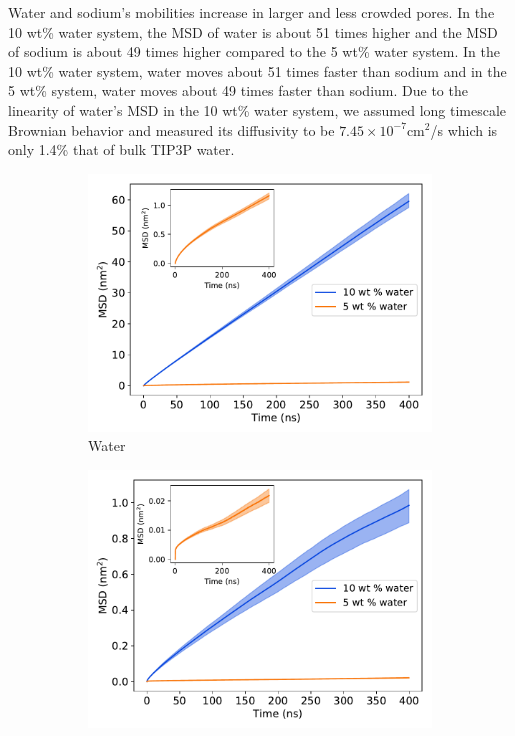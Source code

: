 \documentclass[journal=jpcbfk,manuscript=article]{achemso}
\begin{document}
  Water and sodium's mobilities increase in larger and less crowded pores. 
  In the 10 wt\% water system, the MSD of water is about 51 times higher and
  the MSD of sodium is about 49 times higher compared to the 5 wt\% water system. 
  In the 10 wt\% water system, water moves about 51 times faster than sodium 
  and in the 5 wt\% system, water moves about 49 times faster than sodium. Due to
  the linearity of water's MSD in the 10 wt\% water system, we assumed
  long timescale Brownian behavior and measured its diffusivity to be 
  $7.45 \times 10^{-7}$cm$^2$/s which is only 1.4\% that of bulk TIP3P 
  water.~\cite{mahoney_diffusion_2000} %
  
  \begin{figure}[!htb]
  \centering
  \begin{subfigure}{0.45\textwidth}
  \includegraphics[width=\textwidth]{water_msd_comparison.pdf}
  \caption{Water}\label{fig:water_msd_comparison}
  \end{subfigure}
  \begin{subfigure}{0.45\textwidth}
  \includegraphics[width=\textwidth]{na_msd_comparison.pdf}

\end{subfigure}
\end{figure}
\end{document}
